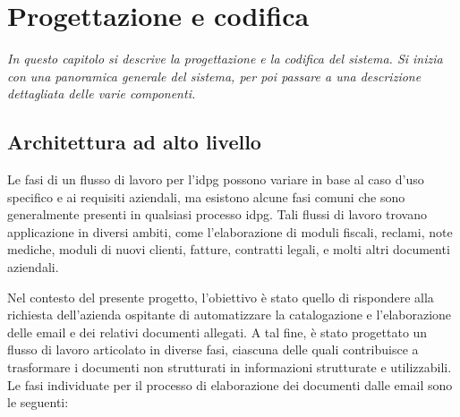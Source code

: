 \chapter{Progettazione e codifica}
\label{cap:progettazione-codifica}

\emph{In questo capitolo si descrive la progettazione e la codifica del sistema. Si inizia con una panoramica generale del sistema, per poi passare a una descrizione dettagliata delle varie componenti.}

\section{Architettura ad alto livello}
Le fasi di un flusso di lavoro per l'\gls{idpg} possono variare in base al caso d'uso specifico e ai requisiti aziendali, ma esistono alcune fasi comuni che sono generalmente presenti in qualsiasi processo \gls{idpg}. Tali flussi di lavoro trovano applicazione in diversi ambiti, come l'elaborazione di moduli fiscali, reclami, note mediche, moduli di nuovi clienti, fatture, contratti legali, e molti altri documenti aziendali. 

Nel contesto del presente progetto, l'obiettivo è stato quello di rispondere alla richiesta dell'azienda ospitante di automatizzare la catalogazione e l'elaborazione delle email e dei relativi documenti allegati. A tal fine, è stato progettato un flusso di lavoro articolato in diverse fasi, ciascuna delle quali contribuisce a trasformare i documenti non strutturati in informazioni strutturate e utilizzabili. Le fasi individuate per il processo di elaborazione dei documenti dalle email sono le seguenti:


